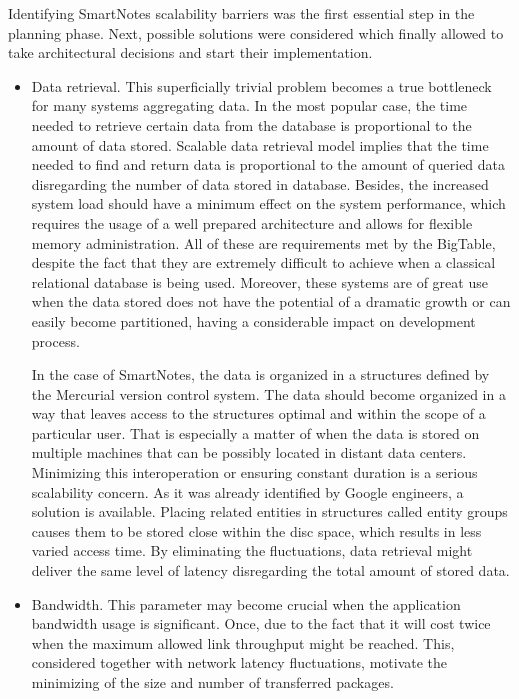 Identifying SmartNotes scalability barriers was the first essential step in the planning phase. Next, possible solutions were considered which finally allowed to take architectural decisions and start their implementation.  
\begin{itemize}
\item{Data retrieval. This superficially trivial problem becomes a true bottleneck for many systems aggregating data. In the most popular case, the time needed to retrieve certain data from the database is proportional to the amount of data stored. Scalable data retrieval model implies that the time needed to find and return data is proportional to the amount of queried data disregarding the number of data stored in database. Besides, the increased system load should have a minimum effect on the system performance, which requires the usage of a well prepared architecture and allows for flexible memory administration. All of these are requirements met by the BigTable, despite the fact that they are extremely difficult to achieve when a classical relational database is being used. Moreover, these systems are of great use when the data stored does not have the potential of a dramatic growth or can easily become partitioned, having a considerable impact on development process. 
 
In the case of SmartNotes, the data is organized in a structures defined by the Mercurial version control system. The data should become organized in a way that leaves access to the structures optimal and within the scope of a particular user. That is especially a matter of when the data is stored on multiple machines that can be possibly located in distant data centers. Minimizing this interoperation or ensuring constant duration is a serious scalability concern. As it was already identified by Google engineers, a solution is available. Placing related entities in structures called entity groups causes them to be stored close within the disc space, which results in less varied access time. By eliminating the fluctuations, data retrieval might deliver the same level of latency disregarding the total amount of stored data.}
\item{Bandwidth. This parameter may become crucial when the application bandwidth usage is significant. Once, due to the fact that it will cost twice when the maximum allowed link throughput might be reached. This, considered together with network latency fluctuations, motivate the minimizing of the size and number of transferred packages.
 
}
\end{itemize}
